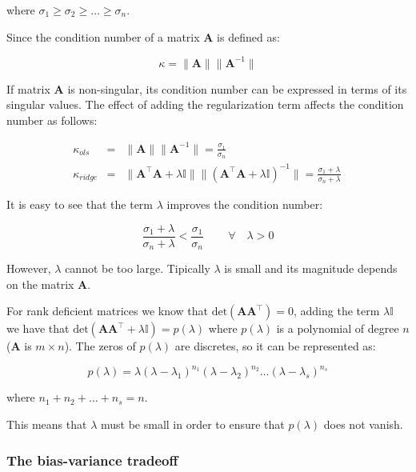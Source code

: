 where $\sigma_1 \geq \sigma_2 \geq \dots \geq \sigma_n$.

Since the condition number of a matrix $\mathbf{A}$ is defined as:

\begin{equation*}
	\kappa = \|\mathbf{A}\| \|\mathbf{A}^{-1}\|
\end{equation*}

If matrix $\mathbf{A}$ is non-singular, its condition number can be
expressed in terms of its singular values. The effect of adding the
regularization term affects the condition number as follows:

\begin{eqnarray*}
\kappa_{ols} &=& \|\mathbf{A}\| \|\mathbf{A}^{-1}\|=\frac{\sigma_1}{\sigma_n} \\
\kappa_{ridge} &=& \|\mathbf{A}^\intercal \mathbf{A} + \lambda \mathbb{I}\| 
\|(\mathbf{A}^\intercal \mathbf{A} + \lambda \mathbb{I})^{-1}\|=\frac{\sigma_1+\lambda}{\sigma_n + \lambda} \,
\end{eqnarray*}

It is easy to see that the term $\lambda$ improves the condition number: 

\begin{equation*}
        \frac{\sigma_1+\lambda}{\sigma_n + \lambda} <
        \frac{\sigma_1}{\sigma_n} \,  \qquad \forall \quad \lambda > 0
\end{equation*}


However, $\lambda$ cannot be too large. Tipically $\lambda$ is small and its
magnitude depends on the matrix $\mathbf{A}$.

For rank deficient matrices we know that $\text{det}(\mathbf{A A^\top})=0$, adding the
term $\lambda \mathbb{I}$ we have that $\text{det}(\mathbf{A A^\top}+\lambda \mathbb{I}) =
p(\lambda)$ where $p(\lambda)$ is a polynomial of degree $n$ ($\mathbf{A}$ is
$m \times n$). The zeros of $p(\lambda)$ are discretes, so it can be represented
as:

\[
p(\lambda) =
\lambda(\lambda-\lambda_1)^{n_1}(\lambda-\lambda_2)^{n_2}\dots(\lambda-\lambda_s)^{n_s}
\]

\noindent where $n_1 + n_2 + \dots + n_s = n$.

This means that $\lambda$ must be small in order to ensure that $p(\lambda)$
does not vanish.

\subsubsection{The bias-variance tradeoff}

